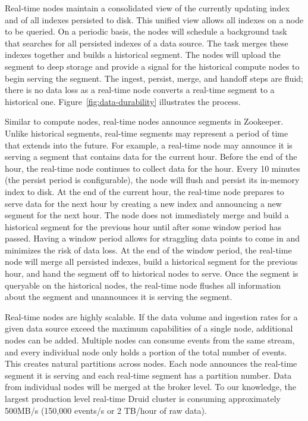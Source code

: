 \documentclass{vldb}
\begin{document}
Real-time nodes maintain a consolidated view of the currently updating
index and of all indexes persisted to disk. This unified view allows
all indexes on a node to be queried. On a periodic basis, the nodes will
schedule a background task that searches for all persisted indexes of
a data source. The task merges these indexes together and builds a
historical segment. The nodes will upload the segment to deep storage
and provide a signal for the historical compute nodes to begin serving
the segment. The ingest, persist, merge, and handoff steps are fluid;
there is no data loss as a real-time node converts a real-time segment
to a historical one. Figure~\ref{fig:data-durability} illustrates the process.

Similar to compute nodes, real-time nodes announce segments in
Zookeeper. Unlike historical segments, real-time segments may
represent a period of time that extends into the future. For example,
a real-time node may announce it is serving a segment that contains
data for the current hour. Before the end of the hour, the real-time
node continues to collect data for the hour. Every 10 minutes (the
persist period is configurable), the node will flush and persist its
in-memory index to disk. At the end of the current hour, the real-time
node prepares to serve data for the next hour by creating a new index
and announcing a new segment for the next hour. The node does not
immediately merge and build a historical segment for the previous hour
until after some window period has passed. Having a window period
allows for straggling data points to come in and minimizes the risk of
data loss. At the end of the window period, the real-time node will
merge all persisted indexes, build a historical segment for the
previous hour, and hand the segment off to historical nodes to
serve. Once the segment is queryable on the historical nodes, the
real-time node flushes all information about the segment and
unannounces it is serving the segment.

Real-time nodes are highly scalable. If the data volume and ingestion
rates for a given data source exceed the maximum capabilities of a
single node, additional nodes can be added.  Multiple nodes can
consume events from the same stream, and every individual node only
holds a portion of the total number of events.  This creates natural
partitions across nodes. Each node announces the real-time segment it
is serving and each real-time segment has a partition number.  Data
from individual nodes will be merged at the broker level.  To our
knowledge, the largest production level real-time Druid cluster is
consuming approximately 500MB/s (150,000 events/s or 2 TB/hour of raw data).
\end{document}
